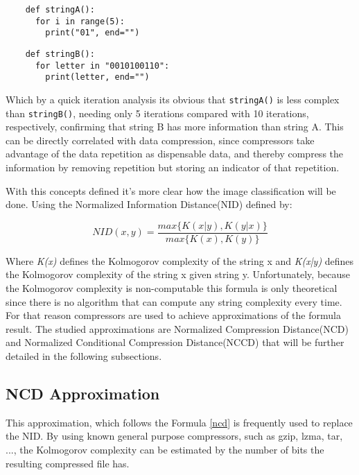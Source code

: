 \documentclass[12pt]{article}
\begin{document}
\vspace{0.2in}
\begin{minipage}{0.45\textwidth}
  \begin{verbatim}
    def stringA():
      for i in range(5):
        print("01", end="")
  \end{verbatim}
\end{minipage}
\begin{minipage}{0.45\textwidth}
  \begin{verbatim}
    def stringB():
      for letter in "0010100110":
        print(letter, end="")
  \end{verbatim}
\end{minipage}
\vspace{0.2in}

Which by a quick iteration analysis its obvious that \texttt{stringA()} is less complex than \texttt{stringB()}, needing only 5 iterations compared with 10 iterations, respectively, confirming that string B has more information than string A. This can be directly correlated with data compression, since compressors take advantage of the data repetition as dispensable data, and thereby compress the information by removing repetition but storing an indicator of that repetition.

With this concepts defined it's more clear how the image classification will be done. Using the Normalized Information Distance(NID) defined by:

\begin{equation}
  NID(x,y) = \frac{max\{K(x|y),K(y|x)\}}{max\{K(x),K(y)\}}
\end{equation}

Where \textit{K(x)} defines the Kolmogorov complexity of the string x and \textit{K(x|y)} defines the Kolmogorov complexity of the string x given string y. Unfortunately, because the Kolmogorov complexity is non-computable this formula is only theoretical since there is no algorithm that can compute any string complexity every time. For that reason compressors are used to achieve approximations of the formula result. The studied approximations are Normalized Compression Distance(NCD) and Normalized Conditional Compression Distance(NCCD) that will be further detailed in the following subsections.

\subsection{NCD Approximation}
This approximation, which follows the Formula \ref{ncd} is frequently used to replace the NID. By using known general purpose compressors, such as gzip, lzma, tar, ..., the Kolmogorov complexity can be estimated by the number of bits the resulting compressed file has. 
\end{document}
